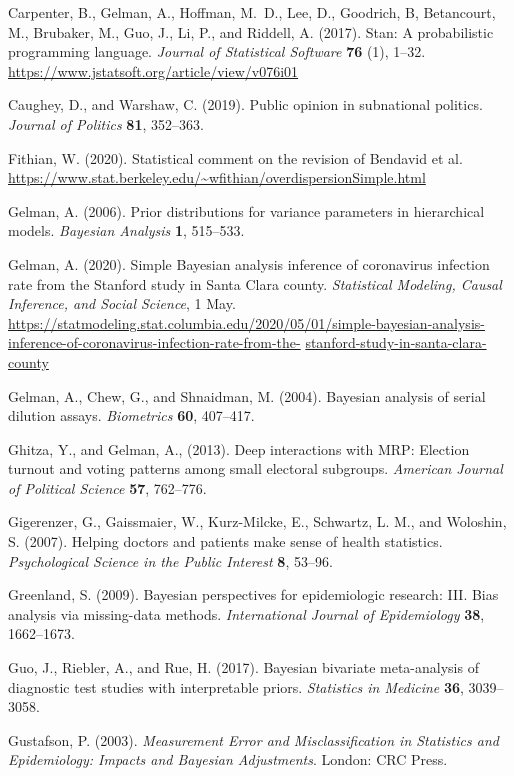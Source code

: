 \documentclass[11pt]{article}
\begin{document}
\bibitem Carpenter, B., Gelman, A., Hoffman, M.~D., Lee, D., Goodrich,
  B, Betancourt, M., Brubaker, M., Guo, J., Li, P., and Riddell, A.
  (2017). Stan: A probabilistic programming language. {\em Journal of
    Statistical Software} {\bf 76} (1), 1--32. {\small
    \url{https://www.jstatsoft.org/article/view/v076i01}}

\bibitem Caughey, D., and Warshaw, C. (2019).  Public opinion in
  subnational politics.  {\em Journal of Politics} {\bf 81}, 352--363.

\bibitem Fithian, W. (2020).  Statistical comment on the revision of
  Bendavid et al. {\small
    \url{https://www.stat.berkeley.edu/~wfithian/overdispersionSimple.html}}

\bibitem Gelman, A. (2006). Prior distributions for variance
  parameters in hierarchical models. {\em Bayesian Analysis} {\bf 1},
  515--533.
  
\bibitem Gelman, A. (2020).  Simple Bayesian analysis inference of
  coronavirus infection rate from the Stanford study in Santa Clara
  county. {\em Statistical Modeling, Causal Inference, and Social
    Science}, 1 May.  {\small \url{https://statmodeling.stat.columbia.edu/2020/05/01/simple-bayesian-analysis-inference-of-coronavirus-infection-rate-from-the-}} {\small \url{stanford-study-in-santa-clara-county}}
  
\bibitem Gelman, A., Chew, G., and Shnaidman, M. (2004).  Bayesian
  analysis of serial dilution assays. {\em Biometrics} {\bf 60},
  407--417.

\bibitem Ghitza, Y., and Gelman, A., (2013). Deep interactions with
  MRP: Election turnout and voting patterns among small electoral
  subgroups. {\em American Journal of Political Science} {\bf 57},
  762--776.

\bibitem Gigerenzer, G., Gaissmaier, W., Kurz-Milcke, E., Schwartz,
  L. M., and Woloshin, S.  (2007).  Helping doctors and patients make
  sense of health statistics.  {\em Psychological Science in the
    Public Interest} {\bf 8}, 53--96.

\bibitem Greenland, S. (2009).  Bayesian perspectives for
  epidemiologic research: III. Bias analysis via missing-data methods.
  {\em International Journal of Epidemiology} {\bf 38}, 1662--1673.

\bibitem Guo, J., Riebler, A., and Rue, H. (2017).  Bayesian bivariate
  meta-analysis of diagnostic test studies with interpretable priors.
  {\em Statistics in Medicine} {\bf 36}, 3039--3058.

\bibitem Gustafson, P. (2003).  {\em Measurement Error and
    Misclassification in Statistics and Epidemiology: Impacts and
    Bayesian Adjustments}.  London: CRC Press.
\end{document}
